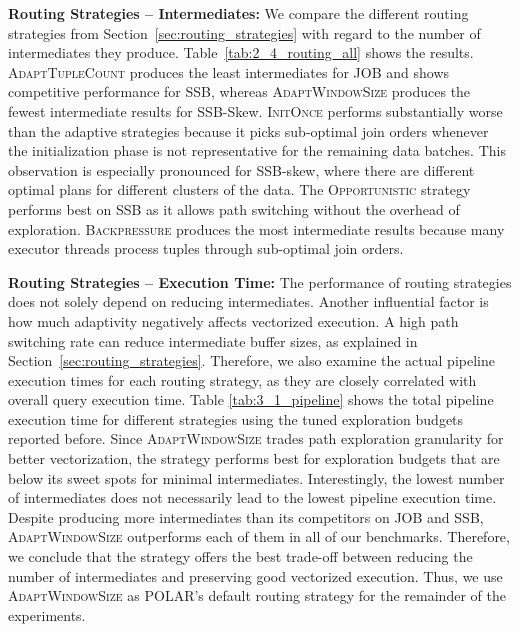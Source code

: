

\textbf{Routing Strategies -- Intermediates:} We compare the different routing strategies from Section~\ref{sec:routing_strategies} with regard to the number of intermediates they produce. Table~\ref{tab:2_4_routing_all} shows the results. \textsc{AdaptTupleCount} produces the least intermediates for JOB and shows competitive performance for SSB, whereas \textsc{AdaptWindowSize} produces the fewest intermediate results for SSB-Skew. \textsc{InitOnce} performs substantially worse than the adaptive strategies because it picks sub-optimal join orders whenever the initialization phase is not representative for the remaining data batches. This observation is especially pronounced for SSB-skew, where there are different optimal plans for different clusters of the data. The \textsc{Opportunistic} strategy performs best on SSB as it allows path switching without the overhead of exploration. \textsc{Backpressure} produces the most intermediate results because many executor threads process tuples through sub-optimal join orders.



\textbf{Routing Strategies -- Execution Time:} The performance of routing strategies does not solely depend on reducing intermediates. Another influential factor is how much adaptivity negatively affects vectorized execution. A high path switching rate can reduce intermediate buffer sizes, as explained in Section~\ref{sec:routing_strategies}. Therefore, we also examine the actual pipeline execution times for each routing strategy, as they are closely correlated with overall query execution time. Table \ref{tab:3_1_pipeline} shows the total pipeline execution time for different strategies using the tuned exploration budgets reported before. Since \textsc{AdaptWindowSize} trades path exploration granularity for better vectorization, the strategy performs best for exploration budgets that are below its sweet spots for minimal intermediates. Interestingly, the lowest number of intermediates does not necessarily lead to the lowest pipeline execution time. 
Despite producing more intermediates than its competitors on JOB and SSB, \textsc{AdaptWindowSize} outperforms each of them in all of our benchmarks. Therefore, we conclude that the strategy offers the best trade-off between reducing the number of intermediates and preserving good vectorized execution. Thus, we use \textsc{AdaptWindowSize} as POLAR's default routing strategy for the remainder of the experiments.

